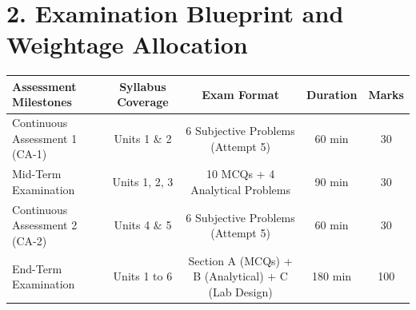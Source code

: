 \section*{2. Examination Blueprint and Weightage Allocation}
\begin{center}
\begin{tabular}{lcccc}
\toprule
\textbf{Assessment Milestones} & \textbf{Syllabus Coverage} & \textbf{Exam Format} & \textbf{Duration} & \textbf{Marks} \\
\midrule
Continuous Assessment 1 (CA-1) & Units 1 \& 2 & 6 Subjective Problems (Attempt 5) & 60 min & 30 \\
Mid-Term Examination & Units 1, 2, 3 & 10 MCQs + 4 Analytical Problems & 90 min & 30 \\
Continuous Assessment 2 (CA-2) & Units 4 \& 5 & 6 Subjective Problems (Attempt 5) & 60 min & 30 \\
End-Term Examination & Units 1 to 6 & Section A (MCQs) + B (Analytical) + C (Lab Design) & 180 min & 100 \\
\bottomrule
\end{tabular}
\end{center}
\newpage
